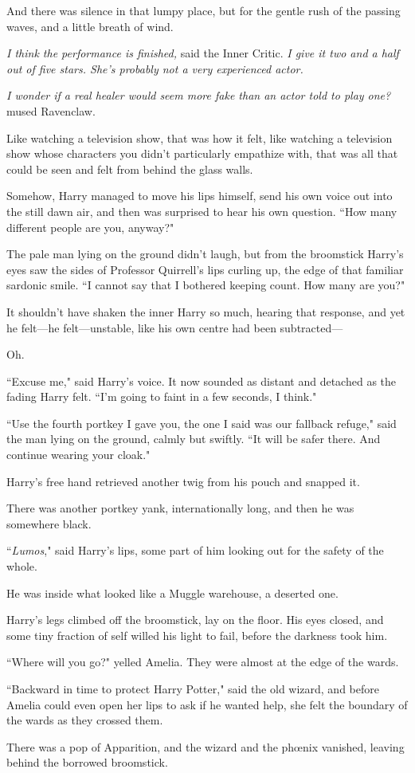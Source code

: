 And there was silence in that lumpy place, but for the gentle rush of the passing waves, and a little breath of wind.

\emph{I think the performance is finished,} said the Inner Critic. \emph{I give it two and a half out of five stars. She's probably not a very experienced actor.}

\emph{I wonder if a real healer would seem more fake than an actor told to play one?} mused Ravenclaw.

Like watching a television show, that was how it felt, like watching a television show whose characters you didn't particularly empathize with, that was all that could be seen and felt from behind the glass walls.

Somehow, Harry managed to move his lips himself, send his own voice out into the still dawn air, and then was surprised to hear his own question. ``How many different people are you, anyway?"

The pale man lying on the ground didn't laugh, but from the broomstick Harry's eyes saw the sides of Professor Quirrell's lips curling up, the edge of that familiar sardonic smile. ``I cannot say that I bothered keeping count. How many are you?"

It shouldn't have shaken the inner Harry so much, hearing that response, and yet he felt—he felt—unstable, like his own centre had been subtracted—

Oh.

``Excuse me," said Harry's voice. It now sounded as distant and detached as the fading Harry felt. ``I'm going to faint in a few seconds, I think."

``Use the fourth portkey I gave you, the one I said was our fallback refuge," said the man lying on the ground, calmly but swiftly. ``It will be safer there. And continue wearing your cloak."

Harry's free hand retrieved another twig from his pouch and snapped it.

There was another portkey yank, internationally long, and then he was somewhere black.

``\emph{Lumos}," said Harry's lips, some part of him looking out for the safety of the whole.

He was inside what looked like a Muggle warehouse, a deserted one.

Harry's legs climbed off the broomstick, lay on the floor. His eyes closed, and some tiny fraction of self willed his light to fail, before the darkness took him.

\later

``Where will you go?" yelled Amelia. They were almost at the edge of the wards.

``Backward in time to protect Harry Potter," said the old wizard, and before Amelia could even open her lips to ask if he wanted help, she felt the boundary of the wards as they crossed them.

There was a pop of Apparition, and the wizard and the phœnix vanished, leaving behind the borrowed broomstick.

